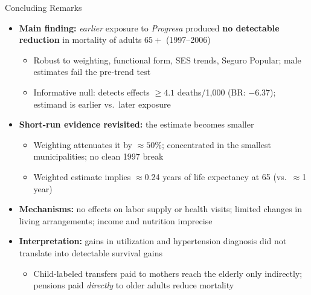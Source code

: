 \documentclass[aspectratio=169,usenames,dvipsnames]{beamer}
\newcommand{\smallcite}[1]{{\footnotesize\textcolor{Blue}{\citep{#1}}}}
\begin{document}
\begin{frame}{Concluding Remarks}\label{conclusion}
\footnotesize
\begin{itemize}
  \item[$\circ$] \textbf{Main finding:} \textit{earlier} exposure to \textit{Progresa} produced \textbf{no detectable reduction} in mortality of adults $65+$ (1997--2006)
    \begin{itemize}
      \item Robust to weighting, functional form, SES trends, Seguro Popular; male estimates fail the pre-trend test
      \item Informative null: detects effects $\geq 4.1$ deaths/1,000 (BR: $-6.37$); estimand is earlier vs.\ later exposure
    \end{itemize}
  \vspace{1pt}
  \item[$\circ$] \textbf{Short-run evidence revisited:} the \smallcite{BarhamRowberry2013JDE} estimate becomes  smaller
    \begin{itemize}
      \item Weighting attenuates it by $\approx 50\%$; concentrated in the smallest municipalities; no clean 1997 break
      \item Weighted estimate implies $\approx$0.24 years of life expectancy at 65 (vs.\ $\approx$1 year)
    \end{itemize}
  \vspace{1pt}
  \item[$\circ$] \textbf{Mechanisms:} no effects on labor supply or health visits; limited changes in living arrangements; income and nutrition imprecise
  \vspace{1pt}
  \item[$\circ$] \textbf{Interpretation:} gains in utilization and hypertension diagnosis \smallcite{BehrmanParker2013Demography, aguila2024conditional} did not translate into detectable survival gains
    \begin{itemize}
      \item Child-labeled transfers paid to mothers reach the elderly only indirectly; pensions paid \textit{directly} to older adults reduce mortality \smallcite{Menares2026JHR, MiglinoNavarrete2023AEJP}
    \end{itemize}
\end{itemize}
\end{frame}

\end{document}
